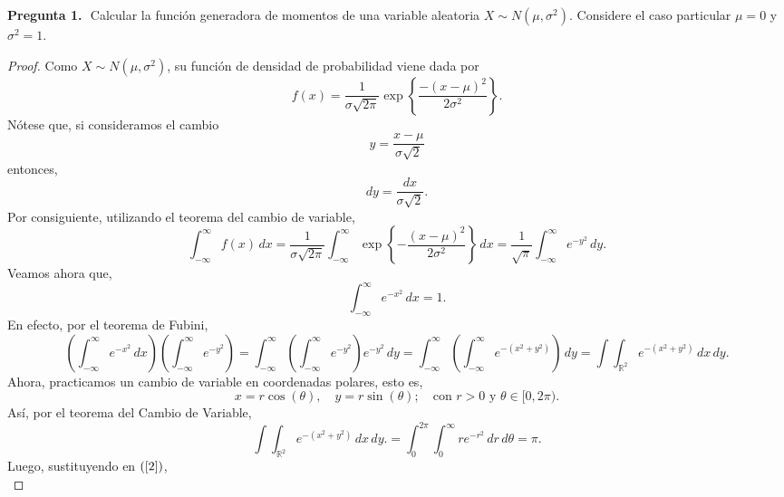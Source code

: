 \documentclass[12pt,legalpaper]{report}
\theoremstyle{plain} \newtheorem{teo}{Teorema}[chapter]
\theoremstyle{definition} \newtheorem{Def}[teo]{Definici\'on}
\begin{document}
\noindent\textbf{Pregunta 1.}\,\, Calcular la funci\'on generadora de momentos de una variable aleatoria $X\sim N(\mu,\sigma^{2})$. Considere el caso particular $\mu=0$ y $\sigma^{2}=1$.
\begin{proof}
Como $X\sim N(\mu,\sigma^{2})$, su funci\'on de densidad de probabilidad viene dada por \begin{equation*}
\displaystyle f(x)=\frac{1}{\sigma\sqrt{2\pi}}\exp\left\{\frac{-(x-\mu)^{2}}{2\sigma^{2}}\right\}.
\end{equation*}
N\'otese que, si consideramos el cambio
\begin{equation*}
y=\frac{x-\mu}{\sigma\sqrt{2}}
\end{equation*}
entonces,
\begin{equation*}
dy=\frac{dx}{\sigma\sqrt{2}}.
\end{equation*}
Por consiguiente, utilizando el teorema del cambio de variable,
\begin{equation}\label{1}
\displaystyle\int_{-\infty}^{\infty}f(x)\,dx=
\frac{1}{\sigma\sqrt{2\pi}}\int_{-\infty}^{\infty}\exp\left\{-\frac{(x-\mu)^{2}}{2\sigma^{2}}\right\}\,dx
=\frac{1}{\sqrt{\pi}}\int_{-\infty}^{\infty}e^{-y^{2}}\,dy.
\end{equation}
Veamos ahora que,
\begin{equation*}
\displaystyle\int_{-\infty}^{\infty}e^{-x^{2}}\,dx=1.
\end{equation*}
En efecto, por el teorema de Fubini,
\begin{equation}\label{2}
\left(\displaystyle\int_{-\infty}^{\infty}e^{-x^{2}}\,dx\right)
\left(\displaystyle\int_{-\infty}^{\infty}e^{-y^{2}}\right)
=\int_{-\infty}^{\infty}\left(\int_{-\infty}^{\infty}e^{-y^{2}}\right)e^{-y^{2}}\,dy
=\int_{-\infty}^{\infty}\left(\int_{-\infty}^{\infty}e^{-(x^{2}+y^{2})}\right)\,dy
=\int\int_{\mathbb{R}^{2}}e^{-(x^{2}+y^{2})}\,dx\,dy.
\end{equation}
Ahora, practicamos un cambio de variable en coordenadas polares, esto es,
\begin{equation*}
x=r\cos(\theta),\quad y=r\sin(\theta);\quad \text{con $r>0$ y $\theta\in[0,2\pi)$.}
\end{equation*}
As\'i, por el teorema del Cambio de Variable,
\begin{equation*}
\int\int_{\mathbb{R}^{2}}e^{-(x^{2}+y^{2})}\,dx\,dy.
=\int_{0}^{2\pi}\int_{0}^{\infty}re^{-r^{2}}\,dr\,d\theta
=\pi.
\end{equation*}
Luego, sustituyendo en $(\ref{2})$,
\begin{equation*}

\end{equation*}
\end{proof}
\end{document}
